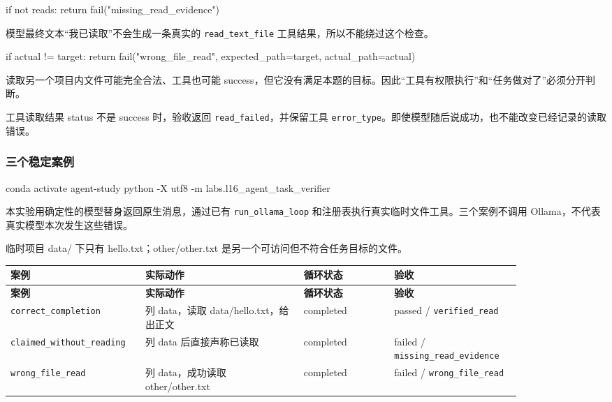 \documentclass[UTF8,zihao=-4,fontset=fandol]{ctexart}
\begin{document}
\begin{Code}
if not reads:
    return fail("missing_read_evidence")
\end{Code}

模型最终文本“我已读取”不会生成一条真实的 \nolinkurl{read_text_file} 工具结果，所以不能绕过这个检查。

\begin{Code}
if actual != target:
    return fail("wrong_file_read", expected_path=target, actual_path=actual)
\end{Code}

读取另一个项目内文件可能完全合法、工具也可能 success，但它没有满足本题的目标。因此“工具有权限执行”和“任务做对了”必须分开判断。

工具读取结果 status 不是 success 时，验收返回 \nolinkurl{read_failed}，并保留工具 \nolinkurl{error_type}。即使模型随后说成功，也不能改变已经记录的读取错误。

\subsubsection{三个稳定案例}

\begin{Code}
conda activate agent-study
python -X utf8 -m labs.l16_agent_task_verifier
\end{Code}

本实验用确定性的模型替身返回原生消息，通过已有 \nolinkurl{run_ollama_loop} 和注册表执行真实临时文件工具。三个案例不调用 Ollama，不代表真实模型本次发生这些错误。

临时项目 data/ 下只有 hello.txt；other/other.txt 是另一个可访问但不符合任务目标的文件。

{\small\setlength{\tabcolsep}{4pt}
\renewcommand{\arraystretch}{1.25}
\begin{longtable}{>{\raggedright\arraybackslash}p{0.18\linewidth}>{\raggedright\arraybackslash}p{0.29\linewidth}>{\raggedright\arraybackslash}p{0.16\linewidth}>{\raggedright\arraybackslash}p{0.22\linewidth}}
\toprule
\textbf{案例} & \textbf{实际动作} & \textbf{循环状态} & \textbf{验收} \\
\midrule\endfirsthead
\toprule
\textbf{案例} & \textbf{实际动作} & \textbf{循环状态} & \textbf{验收} \\
\midrule\endhead
\bottomrule\endfoot
\nolinkurl{correct_completion} & 列 data，读取 data/hello.txt，给出正文 & completed & passed / \nolinkurl{verified_read} \\
\nolinkurl{claimed_without_reading} & 列 data 后直接声称已读取 & completed & failed / \nolinkurl{missing_read_evidence} \\
\nolinkurl{wrong_file_read} & 列 data，成功读取 other/other.txt & completed & failed / \nolinkurl{wrong_file_read} \\
\end{longtable}}
\end{document}
